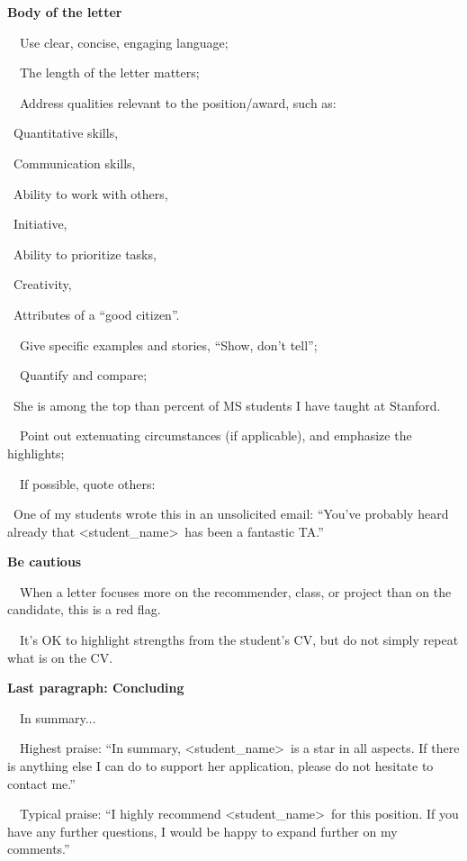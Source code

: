 \documentclass[a4paper, 12pt]{article}
\begin{document}
\newpage\textbf{Body of the letter}
\par\ \textbullet\ Use clear, concise, engaging language;
\par\ \textbullet\ The length of the letter matters;
\par\ \textbullet\ Address qualities relevant to the position/award, such as:
\par\quad\textopenbullet\ Quantitative skills,
\par\quad\textopenbullet\ Communication skills,
\par\quad\textopenbullet\ Ability to work with others,
\par\quad\textopenbullet\ Initiative,
\par\quad\textopenbullet\ Ability to prioritize tasks,
\par\quad\textopenbullet\ Creativity,
\par\quad\textopenbullet\ Attributes of a ``good citizen''.
\par\ \textbullet\ Give specific examples and stories, ``Show, don't tell'';
\par\ \textbullet\ Quantify and compare;
\par\quad\textopenbullet\ She is among the top than percent of MS students I have taught at Stanford.
\par\ \textbullet\ Point out extenuating circumstances (if applicable), and emphasize the highlights;
\par\ \textbullet\ If possible, quote others:
\par\quad\textopenbullet\ One of my students wrote this in an unsolicited email: ``You've probably heard already that \textless student\_name\textgreater\  has been a fantastic TA.''

\textbf{Be cautious}
\par\ \textbullet\ When a letter focuses more on the recommender, class, or project than on the candidate, this is a red flag.
\par\ \textbullet\ It's OK to highlight strengths from the student's CV, but do not simply repeat what is on the CV.

\newpage\textbf{Last paragraph: Concluding}
\par\ \textbullet\ In summary...
\par\ \textbullet\ Highest praise: ``In summary, \textless student\_name\textgreater\ is a star in all aspects. If there is anything else I can do to support her application, please do not hesitate to contact me.''
\par\ \textbullet\ Typical praise: ``I highly recommend \textless student\_name\textgreater\ for this position. If you have any further questions, I would be happy to expand further on my comments.''
\end{document}
